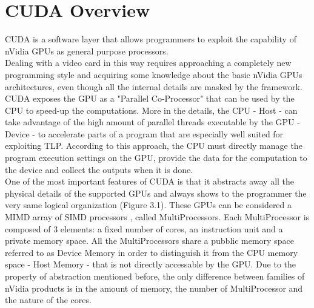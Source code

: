 \chapter{CUDA Overview}\label{sec:i}
CUDA is a software layer that allows programmers to exploit the capability of nVidia GPUs as general purpose processors.\\
Dealing with a video card in this way requires approaching a completely new programming style and acquiring some knowledge about the basic nVidia GPUs architectures, even though all the internal details are masked by the framework.\\
CUDA exposes the GPU as a "Parallel Co-Processor" that can be used by the CPU to speed-up the computations. More in the details, the CPU - Host - can take advantage of the high amount of parallel threads executable by the GPU - Device - to accelerate parts of a program that are especially well suited for exploiting TLP. According to this approach, the CPU must directly manage the program execution settings on the GPU, provide the data for the computation to the device and collect the outputs when it is done.\\
One of the most important features of CUDA is that it abstracts away all the physical details of the supported GPUs and always shows to the programmer  the very same logical organization (Figure 3.1). These GPUs can be considered a MIMD array of SIMD processors %
, called MultiProcessors. Each MultiProcessor is composed of 3 elements: a fixed number of cores, an instruction unit and a private memory space. All the MultiProcessors share a pubblic memory space referred to as Device Memory in order to distinguish it from the CPU memory space - Host Memory - that is not directly accessable by the GPU. Due to the property of abstraction mentioned before, the only difference between families of nVidia products is in the amount of memory, the number of MultiProcessor and the nature of the cores.\\ %

